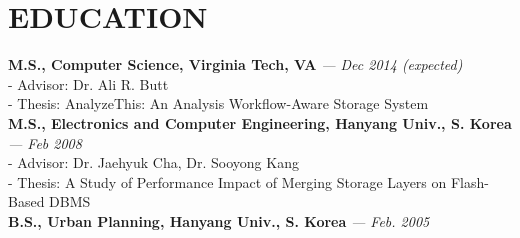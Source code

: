 \section{EDUCATION}
\vspace{0.07in} 
{\bf M.S., Computer Science, Virginia Tech, VA}
{\footnotesize{\it --- Dec 2014 (expected)}} \\
  - {\small Advisor: Dr. Ali R. Butt} \\
  - {\small Thesis: AnalyzeThis: An Analysis Workflow-Aware Storage System}
\vspace{0.03in}\\
{\bf M.S., Electronics and Computer Engineering, Hanyang Univ., S. Korea}
{\footnotesize{\it --- Feb 2008}}\\
  - {\small Advisor: Dr. Jaehyuk Cha, Dr. Sooyong Kang}\\
  - {\small Thesis: A Study of Performance Impact of Merging Storage Layers on
  Flash-Based DBMS}
\vspace{0.03in}\\
{\bf B.S., Urban Planning, Hanyang Univ., S. Korea}
{\footnotesize{\it --- Feb. 2005}}

